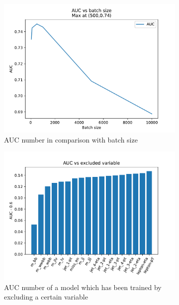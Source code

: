 \documentclass[12pt, a4paper]{article}
\begin{document}
\begin{figure}[H]
\begin{subfigure}{0.5\textwidth}
  \includegraphics[width=\linewidth]{../graphs/batch_auc.pdf}
  \caption{AUC number in comparison with batch size} \label{fig:c}
  \end{subfigure}
  \hspace*{\fill}
  \begin{subfigure}{0.5\textwidth}
  \includegraphics[width=\linewidth]{../graphs/excluded_variable_auc.pdf}
  \caption{AUC number of a model which has been trained by excluding a certain variable} \label{fig:d}
  \end{subfigure} 
  \medskip
  \begin{subfigure}{0.5\textwidth}

\end{subfigure}
\end{figure}
\end{document}
